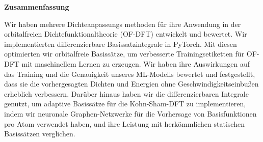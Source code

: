 	\vspace{5cm}
\begin{center}
	\large
    \textbf{Zusammenfassung}
\end{center}
\normalsize
Wir haben mehrere Dichteanpassungs methoden für ihre Anwendung in der orbitalfreien Dichtefunktionaltheorie (OF-DFT) entwickelt und bewertet. Wir implementierten differenzierbare Basissatzintegrale in PyTorch. Mit diesen optimierten wir orbitalfreie Basissätze, um verbesserte Trainingsetiketten für OF-DFT mit maschinellem Lernen zu erzeugen. Wir haben ihre Auswirkungen auf das Training und die Genauigkeit unseres ML-Modells bewertet und festgestellt, dass sie die vorhergesagten Dichten und Energien ohne Geschwindigkeitseinbußen erheblich verbessern. Darüber hinaus haben wir die differenzierbaren Integrale genutzt, um adaptive Basissätze für die Kohn-Sham-DFT zu implementieren, indem wir neuronale Graphen-Netzwerke für die Vorhersage von Basisfunktionen pro Atom verwendet haben, und ihre Leistung mit herkömmlichen statischen Basissätzen verglichen.


